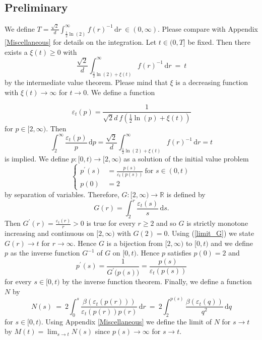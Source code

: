 \documentclass[12pt,longbibliography]{article}
\def\R{\mathbb{R}}
\def\d{\,\mathrm{d}}
\theoremstyle{definition}
\theoremstyle{remark}
\theoremstyle{example}
\begin{document}
\subsection{Preliminary} \label{Preliminary_Proof_IU}

We define $T = \frac{\sqrt{2}}{d} \int_{\frac{1}{2}\ln(2)}^{\infty} f(r)^{-1} \d r \ \in (0,\infty)$. Please compare with
Appendix \ref{Miscellaneous} for details on the integration. Let $t \in (0,T]$ be fixed. Then
there exists a $\xi (t) \geq 0$ with
$$
 \frac{\sqrt{2}}{d} \int_{\frac{1}{2}\ln(2) + \xi (t)}^{\infty} f(r)^{-1} \d r \ = \ t
$$
by the intermediate value theorem. Please mind that $\xi$ is a decreasing function with $\xi (t) \to \infty$ for $t \to 0$.
We define a function

\begin{equation}
\varepsilon_{t}(p) = \frac{1}{\sqrt{2} d \ f( \frac{1}{2}\ln(p) + \xi (t))}
\end{equation}
for $p \in [2,\infty)$. Then
\begin{equation} \label{limit_G}
\int_{2}^{\infty} \frac{\varepsilon_{t}(p)}{p} \d p = 
\frac{\sqrt{2}}{d} \int_{\frac{1}{2}\ln(2) + \xi (t)}^{\infty} f(r)^{-1} \d r = t
\end{equation}
is implied. We define $p \colon [0,t) \to [2,\infty)$ as a solution of the initial value problem
$$
\left\{
\begin{array}{ll} 
p^{\prime}(s) & = \frac{p(s)}{\varepsilon_{t}( p(s))} \ \text{for } s \in (0,t) \\
p(0) & = 2
\end{array}\right. 
$$
by separation of variables. Therefore, $G \colon [2,\infty) \to \R$ is defined by
$$
G(r) = \int_{2}^{r} \frac{\varepsilon_{t}(s)}{s} \d s.
$$
Then $G^{\prime}(r) = \frac{\varepsilon_{t}(r)}{r} > 0$ is true for every $r \geq 2$ and so $G$ is strictly monotone increasing
and continuous on $[2,\infty)$ with $G(2)=0$. Using (\ref{limit_G}) we state $G(r) \to t$ for $r \to \infty$. 
Hence $G$ is a bijection from $[2,\infty)$ to $[0,t)$ and we define $p$ as the inverse function $G^{-1}$ of $G$ on $[0,t)$. 
Hence $p$ satisfies $p(0)=2$ and
\begin{equation}
p^{\prime}(s) = \frac{1}{G^{\prime}\bigl( p(s) \bigr)} = \frac{p(s)}{\varepsilon_{t}(p(s))}
\end{equation}
for every $s \in [0,t)$ by the inverse function theorem. Finally, we define a function $N$ by
\begin{equation}
N(s) \ = \ 2 \int_{0}^{s} \frac{\beta\left( \varepsilon_{t}\left( p(r) \right) \right)}{\varepsilon_{t}\left( p(r) \right) p(r)} \d r
\ = \ 2\int_{2}^{p(s)} \frac{\beta\left( \varepsilon_{t}(q) \right)}{q^{2}} \d q
\end{equation}
for $s \in [0,t)$. Using Appendix \ref{Miscellaneous} we define the limit of $N$ for $s \to t$ by $M(t) = \lim_{s \to t} N(s)$
since $p(s) \to \infty$ for $s \to t$.\\
\end{document}
